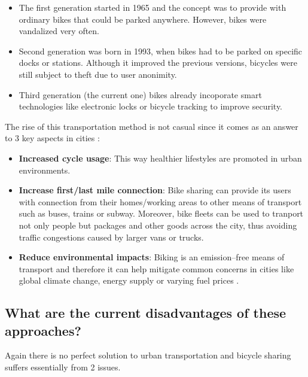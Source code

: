 \begin{itemize}

  \item The first generation started in 1965 and the concept was to provide with ordinary bikes that could be parked anywhere. However, bikes were vandalized very often.

  \item Second generation was born in 1993, when bikes had to be parked on specific docks or stations. Although it improved the previous versions, bicycles were still subject to theft due to user anonimity.

  \item Third generation (the current one) bikes already incoporate smart technologies like electronic locks or bicycle tracking to improve security.

\end{itemize}

The rise of this transportation method is not casual since it comes as an answer to 3 key aspects in cities :

\begin{itemize}

  \item \textbf{Increased cycle usage}: This way healthier lifestyles are promoted in urban environments.

  \item \textbf{Increase first/last mile connection}: Bike sharing can provide its users with connection from their homes/working areas to other means of transport such as buses, trains or subway. Moreover, bike fleets can be used to tranport not only people but packages and other goods across the city, thus avoiding traffic congestions caused by larger vans or trucks.

  \item \textbf{Reduce environmental impacts}: Biking is an emission--free means of transport and therefore it can help mitigate common concerns in cities like global climate change, energy supply or varying fuel prices .

\end{itemize} 

\subsection{What are the current disadvantages of these approaches?}

Again there is no perfect solution to urban transportation and bicycle sharing suffers essentially from 2 issues.

